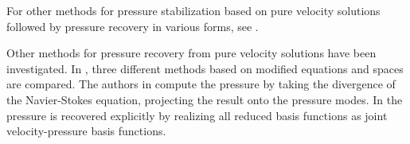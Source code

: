 \documentclass[onecolumn, twoside, a4paper, 11pt]{article}
\begin{document}
For other methods for pressure stabilization based on pure velocity solutions
followed by pressure recovery in various forms, see
\cite{Akhtar2009ser,Caiazzo2014niv,Baiges2013ero}.

Other methods for pressure recovery from pure velocity solutions have been investigated. In
\cite{Caiazzo2014niv}, three different methods based on modified equations and spaces are
compared. The authors in \cite{Akhtar2009ser} compute the pressure by taking the divergence of the
Navier-Stokes equation, projecting the result onto the pressure modes. In \cite{Baiges2013ero} the
pressure is recovered explicitly by realizing all reduced basis functions as joint velocity-pressure
basis functions.



\end{document}

